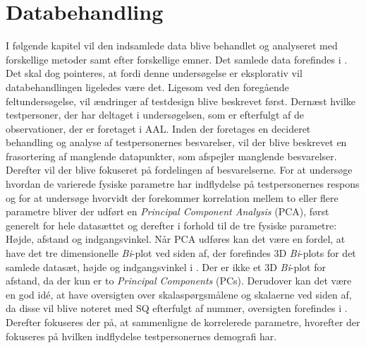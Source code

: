 \chapter{Databehandling}
\label{TestAfSkalaDatabehandling}
%
I følgende kapitel vil den indsamlede data blive behandlet og analyseret med forskellige metoder samt efter forskellige emner. Det samlede data forefindes i . Det skal dog pointeres, at fordi denne undersøgelse er eksplorativ vil databehandlingen ligeledes være det. Ligesom ved den foregående feltundersøgelse, vil ændringer af testdesign blive beskrevet først. Dernæst hvilke testpersoner, der har deltaget i undersøgelsen, som er efterfulgt af de observationer, der er foretaget i AAL. Inden der foretages en decideret behandling og analyse af testpersonernes besvarelser, vil der blive  beskrevet en frasortering af manglende datapunkter, som afspejler manglende besvarelser. Derefter vil der blive fokuseret på fordelingen af besvarelserne. For at undersøge hvordan de varierede fysiske parametre har indflydelse på testpersonernes respons og for at undersøge hvorvidt der forekommer korrelation mellem to eller flere parametre bliver der udført en \textit{Principal Component Analysis} (PCA), først generelt for hele datasættet og derefter i forhold til de tre fysiske parametre: Højde, afstand og indgangsvinkel. Når PCA udføres kan det være en fordel, at have det tre dimensionelle \textit{Bi}-plot ved siden af, der forefindes 3D \textit{Bi}-plots for det samlede datasæt, højde og indgangsvinkel i . Der er ikke et 3D \textit{Bi}-plot for afstand, da der kun er to \textit{Principal Components} (PCs). Derudover kan det være en god idé, at have oversigten over skalaspørgsmålene og skalaerne ved siden af, da disse vil blive noteret med SQ efterfulgt af nummer, oversigten forefindes i . Derefter fokuseres der på, at sammenligne de korrelerede parametre, hvorefter der fokuseres på hvilken indflydelse testpersonernes demografi har.        
